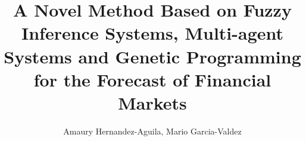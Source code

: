 \documentclass[12pt,journal,draftcls,onecolumn]{IEEEtran}
\begin{document}
%
\title{A Novel Method Based on Fuzzy Inference Systems, Multi-agent
  Systems and Genetic Programming for the Forecast of Financial
  Markets}
%
%
%
%

\author{Amaury Hernandez-Aguila, Mario Garcia-Valdez
}%


% 
%
\end{document}
